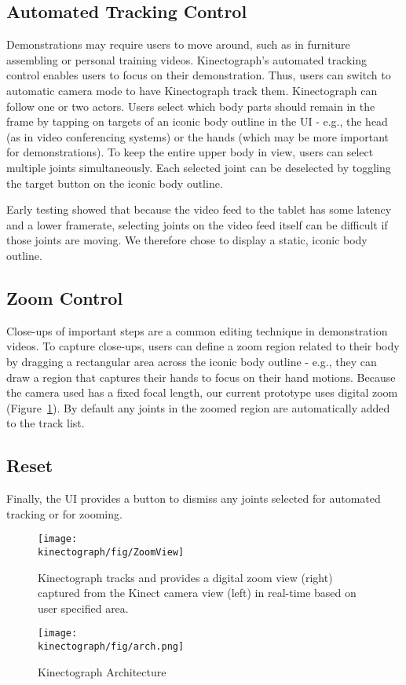 \subsection{Automated Tracking Control}
Demonstrations may require users to move around, such as in furniture assembling or personal training videos. Kinectograph's automated tracking control enables users to focus on their demonstration. Thus, users can switch to automatic camera mode to have Kinectograph track them. Kinectograph can follow one or two actors. Users select which body parts should remain in the frame by tapping on targets of an iconic body outline in the UI - e.g., the head (as in video conferencing systems) or the hands (which may be more important for demonstrations). To keep the entire upper body in view, users can select multiple joints simultaneously. Each selected joint can be deselected by toggling the target button on the iconic body outline.

Early testing showed that because the video feed to the tablet has some latency and a lower framerate, selecting joints on the video feed itself can be difficult if those joints are moving. We therefore chose to display a static, iconic body outline.


\subsection{Zoom Control}
Close-ups of important steps are a common editing technique in demonstration videos. To capture close-ups, users can define a zoom region related to their body by dragging a rectangular area across the iconic body outline - e.g., they can draw a region that captures their hands to focus on their hand motions. Because the camera used has a fixed focal length, our current prototype uses digital zoom (Figure~\ref{fig:ZoomView}). By default any joints in the zoomed region are automatically added to the track list.

\subsection{Reset}
Finally, the UI provides a button to dismiss any joints selected for automated tracking or for zooming.

\begin{figure}[t]
\centering
\texttt{[image: \\kinectograph/fig/ZoomView]}
\caption{Kinectograph tracks and provides a digital zoom view (right) captured from the Kinect camera view (left) in real-time based on user specified area.}
\label{fig:ZoomView}
\end{figure}

\begin{figure}[t]
\centering
\texttt{[image: \\kinectograph/fig/arch.png]}
\caption{Kinectograph Architecture}
\label{fig:architecture}
\end{figure}
